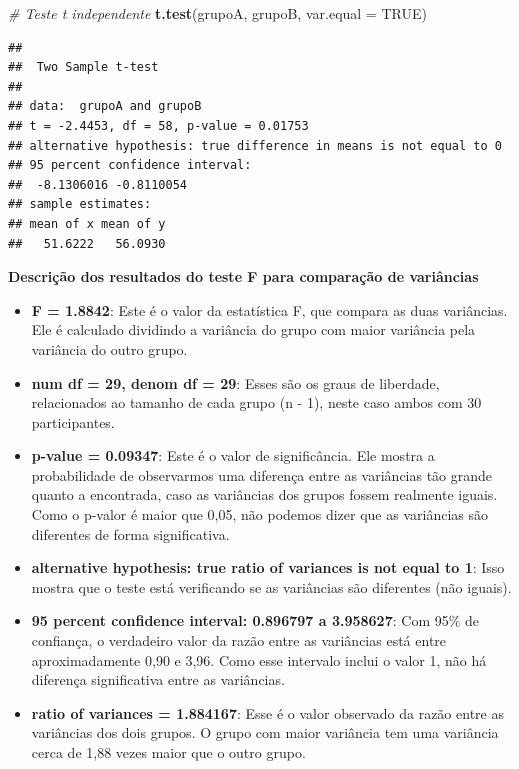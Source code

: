 \documentclass[
]{book}
\newenvironment{Shaded}{\begin{snugshade}}{\end{snugshade}}
\newcommand{\AttributeTok}[1]{\textcolor[rgb]{0.13,0.29,0.53}{#1}}
\newcommand{\CommentTok}[1]{\textcolor[rgb]{0.56,0.35,0.01}{\textit{#1}}}
\newcommand{\ConstantTok}[1]{\textcolor[rgb]{0.56,0.35,0.01}{#1}}
\newcommand{\FunctionTok}[1]{\textcolor[rgb]{0.13,0.29,0.53}{\textbf{#1}}}
\newcommand{\NormalTok}[1]{#1}
\providecommand{\tightlist}{%
  \setlength{\itemsep}{0pt}\setlength{\parskip}{0pt}}
\begin{document}
\begin{Shaded}
\begin{Highlighting}[]
\CommentTok{\# Teste t independente}
\FunctionTok{t.test}\NormalTok{(grupoA, grupoB, }\AttributeTok{var.equal =} \ConstantTok{TRUE}\NormalTok{)}
\end{Highlighting}
\end{Shaded}

\begin{verbatim}
## 
##  Two Sample t-test
## 
## data:  grupoA and grupoB
## t = -2.4453, df = 58, p-value = 0.01753
## alternative hypothesis: true difference in means is not equal to 0
## 95 percent confidence interval:
##  -8.1306016 -0.8110054
## sample estimates:
## mean of x mean of y 
##   51.6222   56.0930
\end{verbatim}

\textbf{Descrição dos resultados do teste F para comparação de variâncias}

\begin{itemize}
\tightlist
\item
  \textbf{F = 1.8842}: Este é o valor da estatística F, que compara as duas variâncias. Ele é calculado dividindo a variância do grupo com maior variância pela variância do outro grupo.
\item
  \textbf{num df = 29, denom df = 29}: Esses são os graus de liberdade, relacionados ao tamanho de cada grupo (n - 1), neste caso ambos com 30 participantes.
\item
  \textbf{p-value = 0.09347}: Este é o valor de significância. Ele mostra a probabilidade de observarmos uma diferença entre as variâncias tão grande quanto a encontrada, caso as variâncias dos grupos fossem realmente iguais. Como o p-valor é maior que 0,05, não podemos dizer que as variâncias são diferentes de forma significativa.
\item
  \textbf{alternative hypothesis: true ratio of variances is not equal to 1}: Isso mostra que o teste está verificando se as variâncias são diferentes (não iguais).
\item
  \textbf{95 percent confidence interval: 0.896797 a 3.958627}: Com 95\% de confiança, o verdadeiro valor da razão entre as variâncias está entre aproximadamente 0,90 e 3,96. Como esse intervalo inclui o valor 1, não há diferença significativa entre as variâncias.
\item
  \textbf{ratio of variances = 1.884167}: Esse é o valor observado da razão entre as variâncias dos dois grupos. O grupo com maior variância tem uma variância cerca de 1,88 vezes maior que o outro grupo.
\end{itemize}
\end{document}

